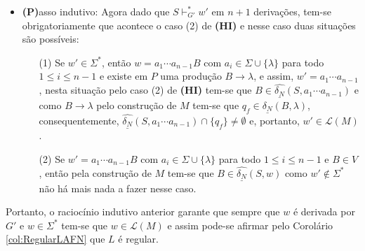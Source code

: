 \begin{prova}
\begin{itemize}
		\item \textbf{(P)}asso indutivo: Agora dado que $S \vdash^*_{G'} w'$ em $n+1$ derivações, tem-se obrigatoriamente que acontece o caso (2) de \textbf{(HI)} e nesse caso duas situações são possíveis:
		\begin{itemize}
			\item[(1)] Se $w' \in \Sigma^*$, então $w = a_1\cdots a_{n-1}B$ com $a_i \in \Sigma \cup \{\lambda\}$ para todo $1 \leq i \leq n-1$ e existe em $P$ uma produção $B \rightarrow \lambda$, e assim, $w' = a_1\cdots a_{n-1}$, nesta situação pelo caso (2) de \textbf{(HI)} tem-se que $B \in \widehat{\underline{\delta_N}}(S, a_1\cdots a_{n-1})$ e como $B \rightarrow \lambda$ pelo construção de $M$ tem-se que $q_f \in \underline{\delta_N}(B, \lambda)$, consequentemente, $\widehat{\underline{\delta_N}}(S, a_1\cdots a_{n-1}) \cap \{q_f\} \neq \emptyset$ e, portanto, $w' \in \mathcal{L}(M)$.
			\item[(2)] Se $w' = a_1\cdots a_{n-1}B$ com $a_i \in \Sigma \cup \{\lambda\}$ para todo $1 \leq i \leq n-1$ e $B \in V$, então pela construção de $M$ tem-se que $B \in \widehat{\underline{\delta_N}}(S, w)$ como $w' \notin \Sigma^*$ não há mais nada a fazer nesse caso.
		\end{itemize}
	\end{itemize}
	Portanto, o raciocínio indutivo anterior garante que sempre que  $w$ é derivada por $G'$ e $w \in \Sigma^*$ tem-se que $w \in \mathcal{L}(M)$ e assim pode-se afirmar pelo Corolário \ref{col:RegularLAFN} que $L$ é regular. 
	

\end{prova}
